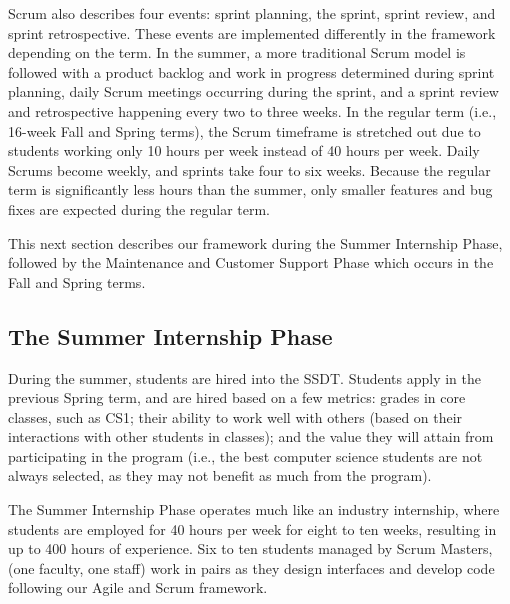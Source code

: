 Scrum also describes four events: sprint planning, the sprint, sprint review, and sprint retrospective. These events are implemented differently in the framework depending on the term. In the summer, a more traditional Scrum model is followed with a product backlog and work in progress determined during sprint planning, daily Scrum meetings occurring during the sprint, and a sprint review and retrospective happening every two to three weeks. In the regular term (i.e., 16-week Fall and Spring terms), the Scrum timeframe is stretched out due to students working only 10 hours per week instead of 40 hours per week. Daily Scrums become weekly, and sprints take four to six weeks. Because the regular term is significantly less hours than the summer, only smaller features and bug fixes are expected during the regular term.


This next section describes our framework during the Summer Internship Phase, followed by the Maintenance and Customer Support Phase which occurs in the Fall and Spring terms. 

\subsection{The Summer Internship Phase}
During the summer, students are hired into the SSDT. Students apply in the previous Spring term, and are hired based on a few metrics: grades in core classes, such as CS1; their ability to work well with others (based on their interactions with other students in classes); and the value they will attain from participating in the program (i.e., the best computer science students are not always selected, as they may not benefit as much from the program). 

The Summer Internship Phase operates much like an industry internship, where students are employed for 40 hours per week for eight to ten weeks, resulting in up to 400 hours of experience. Six to ten students managed by Scrum Masters, (one faculty, one staff) work in pairs as they design interfaces and develop code following our Agile and Scrum framework. 



